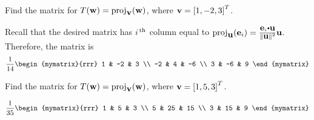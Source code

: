 \begin{enumialphparenastyle}
\begin{ex}
  Find the matrix for
  $T(\vect{w}) = \proj_{\vect{v}}(\vect{w})$, where
  $\mbox{\bf v}=\left[1, -2, 3\right]^{T}$.
  \begin{sol}
    Recall that the desired matrix has $i^{\,\rm th}$ column equal to
    $\proj_{\vect{u}}(\vect{e}_{i}) =
    \frac{\vect{e}_i\dotprod\vect{u}}{\norm{\vect{u}}^{2}}\vect{u}$.
    Therefore, the matrix is
    \begin{equation*}
      \frac{1}{14}\begin{mymatrix}{rrr}
        1 & -2 & 3 \\
        -2 & 4 & -6 \\
        3 & -6 & 9
      \end{mymatrix}
    \end{equation*}
  \end{sol}
\end{ex}

\begin{ex}
  Find the matrix for
  $T(\vect{w}) = \proj_{\vect{v}}(\vect{w})$, where
  $\mbox{\bf v}=\left[1,5,3\right]^{T}$.
  \begin{sol}
    \begin{equation*}
      \frac{1}{35}\begin{mymatrix}{rrr}
        1 & 5 & 3 \\
        5 & 25 & 15 \\
        3 & 15 & 9
      \end{mymatrix}
    \end{equation*}
  \end{sol}
\end{ex}

\end{enumialphparenastyle}
